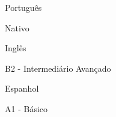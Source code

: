 
\begin{cvskills}

  \cvskill

    {Português}

    {Nativo}

  \cvskill

    {Inglês}

    {B2 - Intermediário Avançado}

  \cvskill

    {Espanhol}

    {A1 - Básico}

\end{cvskills}
 
